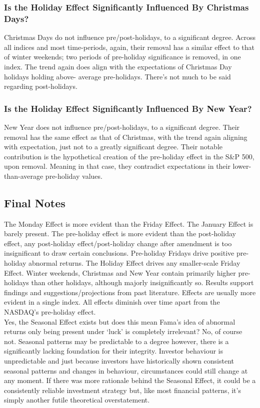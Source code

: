 \documentclass[11pt, english]{article}
\begin{document}
		\subsubsection{Is the Holiday Effect Significantly Influenced By Christmas Days?}

		Christmas Days do not influence pre/post-holidays, to a significant degree. Across all indices and most time-periods, again, their removal has a similar effect to that of winter weekends; two periods of pre-holiday significance is removed, in one index. The trend again does align with the expectations of Christmas Day holidays holding above- average pre-holidays. There’s not much to be said regarding post-holidays.

		\subsubsection{Is the Holiday Effect Significantly Influenced By New Year?}

		New Year does not influence pre/post-holidays, to a significant degree. Their removal has the same effect as that of Christmas, with the trend again aligning with expectation, just not to a greatly significant degree. Their notable contribution is the hypothetical creation of the pre-holiday effect in the S\&P 500, upon removal. Meaning in that case, they contradict expectations in their lower-than-average pre-holiday values.

	\newpage

	\subsection{Final Notes}

	The Monday Effect is more evident than the Friday Effect. The January Effect is barely present. The pre-holiday effect is more evident than the post-holiday effect, any post-holiday effect/post-holiday change after amendment is too insignificant to draw certain conclusions. Pre-holiday Fridays drive positive pre-holiday abnormal returns. The Holiday Effect drives any smaller-scale Friday Effect. Winter weekends, Christmas and New Year contain primarily higher pre-holidays than other holidays, although majorly insignificantly so. Results support findings and suggestions/projections from past literature. Effects are usually more evident in a single index. All effects diminish over time apart from the NASDAQ’s pre-holiday effect.\\

	Yes, the Seasonal Effect exists but does this mean Fama’s idea of abnormal returns only being present under `luck' is completely irrelevant? No, of course not. Seasonal patterns may be predictable to a degree however, there is a significantly lacking foundation for their integrity. Investor behaviour is unpredictable and just because investors have historically shown consistent seasonal patterns and changes in behaviour, circumstances could still change at any moment. If there was more rationale behind the Seasonal Effect, it could be a consistently reliable investment strategy but, like most financial patterns, it’s simply another futile theoretical overstatement.\\
\end{document}
